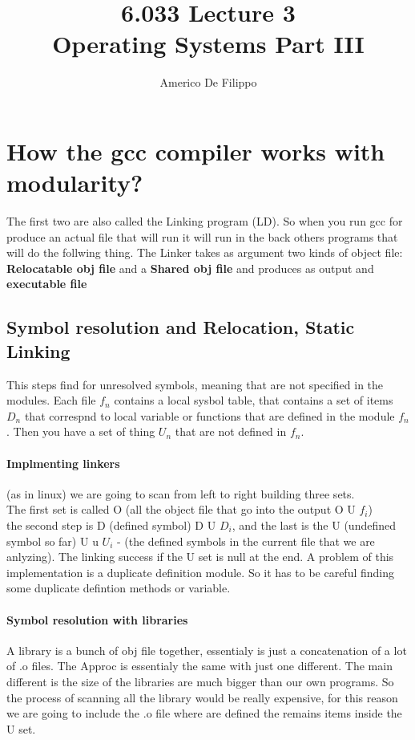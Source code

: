 \documentclass{article}
\title{6.033 Lecture 3 \\ Operating Systems Part III}
\author{Americo De Filippo}
\begin{document}
  \maketitle
  \section{How the gcc compiler works with modularity?}
  The first two are also called the Linking program (LD).
  So when you run gcc for produce an actual file that will 
  run it will run in the back others programs that will do
  the follwing thing. The Linker takes as argument two kinds 
  of object file: 
  \textbf{Relocatable obj file} and a \textbf{Shared obj file} and produces
  as output and \textbf{executable file}
  \subsection{Symbol resolution and Relocation, Static Linking}
    This steps find for unresolved symbols, meaning that are not 
    specified in the modules. Each file $f_n$ contains a local sysbol table, 
    that contains a set of items $D_n$ that correspnd to local variable or functions
    that are defined in the module $f_n$. Then you have a set of thing $U_n$ that are 
    not defined in $f_n$. 
    \paragraph{Implmenting linkers} (as in linux) we are going to scan from left to right 
      building three sets. \\ The first set is called O (all the object file that go into the
      output O U $f_i$) \\ the second step is D (defined symbol) D U $D_i$, and the last is 
      the U (undefined symbol so far) U u $U_i$ - (the defined symbols in the current file
      that we are anlyzing). The linking success if the U set is null at the end. A problem
      of this implementation is a duplicate definition module. So it has to be careful
      finding some duplicate defintion methods or variable.
    \paragraph{Symbol resolution with libraries}
      A library is a bunch of obj file together, essentialy is just a concatenation
      of a lot of .o files. The Approc is essentialy the same with just one different.
      The main different is the size of the libraries are much bigger than our own 
      programs. So the process of scanning all the library would be really expensive, 
      for this reason we are going to include the .o file where are defined the 
      remains items inside the U set.
\end{document}
